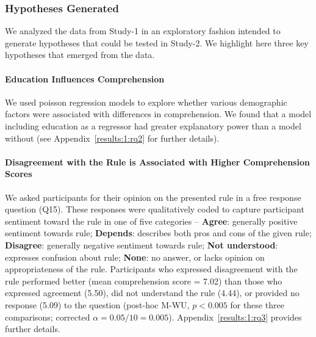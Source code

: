 \documentclass{article}
\newcommand{\studyA}{Study-1}
\newcommand{\studyB}{Study-2}
\newcommand{\Appref}[1]{Appendix~\ref{#1}}
\begin{document}
\subsubsection{Hypotheses Generated} \label{results:a:hypotheses}

We analyzed the data from \studyA{} in an exploratory fashion intended to generate hypotheses that could be tested in \studyB{}. 
We highlight here three key hypotheses that emerged from the data.

\paragraph{Education Influences Comprehension}
We used poisson regression models to explore whether various demographic factors were associated with differences in comprehension. We found that a model including education as a regressor had greater explanatory power than a model without (see \Appref{results:1:rq2} for further details).


\paragraph{Disagreement with the Rule is Associated with Higher Comprehension Scores}

We asked participants for their opinion on the presented rule in a free response question (Q15). These responses were qualitatively coded to capture participant sentiment toward the rule in one of five categories -- \textbf{Agree}: generally positive sentiment towards rule; \textbf{Depends}: describes both pros and cons of the given rule; \textbf{Disagree}: generally negative sentiment towards rule; \textbf{Not understood}: expresses confusion about rule; \textbf{None}: no answer, or lacks opinion on appropriateness of the rule. Participants who expressed disagreement with the rule performed better (mean comprehension score = 7.02) than those who expressed agreement (5.50), did not understand the rule (4.44), or provided no response (5.09) to the question (post-hoc M-WU, $p<0.005$ for these three comparisons;
corrected $\alpha=0.05/10=0.005$). \Appref{results:1:rq3} provides further details.
\end{document}
